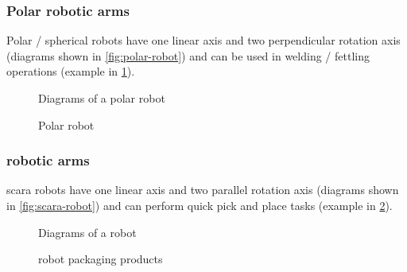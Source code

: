 \subsubsection{Polar robotic arms}

Polar / spherical robots have one linear axis and two perpendicular rotation axis (diagrams shown in \cref{fig:polar-robot}) and can be used in welding / fettling operations (example in \cref{fig:polar-robot-fanuc}).

\begin{figure}[H]
	\begin{floatrow}[2]
		{\caption[Diagrams of a polar robot]{Diagrams of a polar robot\protect\footnotemark}\label{fig:polar-robot}}

		{\caption[Polar robot]{Polar robot\protect\footnotemark}\label{fig:polar-robot-fanuc}}
	\end{floatrow}
\end{figure}


\subsubsection{ robotic arms}

\gls{scara} robots have one linear axis and two parallel rotation axis (diagrams shown in \cref{fig:scara-robot}) and can perform quick pick and place tasks (example in \cref{fig:scara-robot-packaging}).

\begin{figure}[H]
	\begin{floatrow}[2]
		{\caption[Diagrams of a  robot]{Diagrams of a  robot\protect\footnotemark}\label{fig:scara-robot}}

		{\caption[ robot packaging products]{ robot packaging products\protect\footnotemark}\label{fig:scara-robot-packaging}}
	\end{floatrow}
\end{figure}


